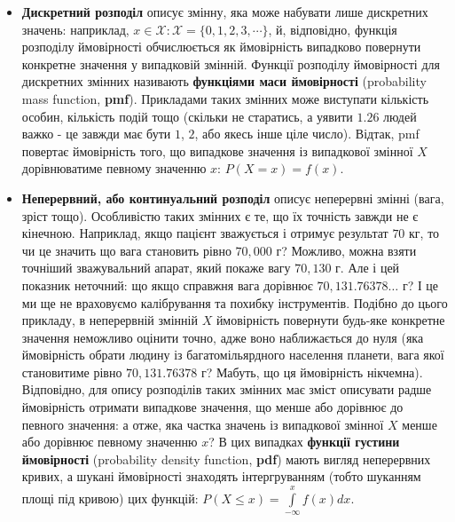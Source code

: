 \documentclass[
  11pt,
]{book}
\begin{document}
\begin{itemize}
\item
  \textbf{Дискретний розподіл} описує змінну, яка може набувати лише дискретних значень: наприклад, \(x \in \mathcal{X}: \mathcal{X} = \{0, 1, 2, 3, \cdots\}\), й, відповідно, функція розподілу ймовірності обчислюється як ймовірність випадково повернути конкретне значення у випадковій змінній. Функції розподілу ймовірності для дискретних змінних називають \textbf{функціями маси ймовірності} (probability mass function, \textbf{pmf}). Прикладами таких змінних може виступати кількість особин, кількість подій тощо (скільки не старатись, а уявити \(1.26\) людей важко - це завжди має бути \(1\), \(2\), або якесь інше ціле число). Відтак, pmf повертає ймовірність того, що випадкове значення із випадкової змінної \(X\) дорівнюватиме певному значенню \(x\): \(P(X = x) = f(x)\).
\item
  \textbf{Неперервний, або континуальний розподіл} описує неперервні змінні (вага, зріст тощо). Особливістю таких змінних є те, що їх точність завжди не є кінечною. Наприклад, якщо пацієнт зважується і отримує результат \(70\) кг, то чи це значить що вага становить рівно \(70,000\) г? Можливо, можна взяти точніший зважувальний апарат, який покаже вагу \(70,130\) г. Але і цей показник неточний: що якщо справжня вага дорівнює \(70,131.76378 \ldots\) г? І це ми ще не враховуємо калібрування та похибку інструментів. Подібно до цього прикладу, в неперервній змінній \(X\) ймовірність повернути будь-яке конкретне значення неможливо оцінити точно, адже воно наближається до нуля (яка ймовірність обрати людину із багатомільярдного населення планети, вага якої становитиме рівно \(70,131.76378\) г? Мабуть, що ця ймовірність нікчемна). Відповідно, для опису розподілів таких змінних має зміст описувати радше ймовірність отримати випадкове значення, що менше або дорівнює до певного значення: а отже, яка частка значень із випадкової змінної \(X\) менше або дорівнює певному значенню \(x\)? В цих випадках \textbf{функції густини ймовірності} (probability density function, \textbf{pdf}) мають вигляд неперервних кривих, а шукані ймовірності знаходять інтергруванням (тобто шуканням площі під кривою) цих функцій: \(P(X \leq x) = \int \limits_{-\infty}^x f(x) dx\).
\end{itemize}
\end{document}
